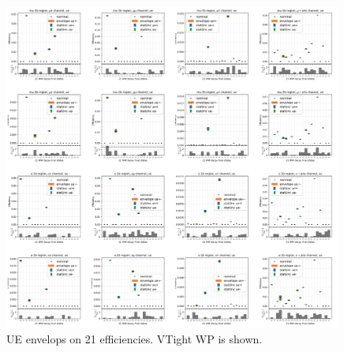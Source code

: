 \begin{figure}
    \centering
    \includegraphics[width=0.99\textwidth]{chapters/Appendix/sectionTTSyst/figures/ue.png}
    

    

    
    \caption{UE envelops on 21 efficiencies. VTight WP is shown.}
    \label{fig:appendix:reweighttt:effAfterCorrUE}
\end{figure}


\FloatBarrier
